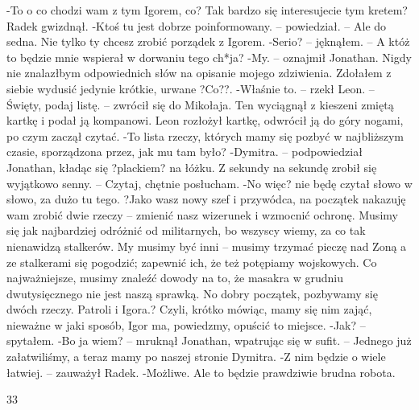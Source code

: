 \documentclass[../MAIN.tex]{subfiles}
\begin{document}
-To o co chodzi wam z tym Igorem, co? Tak bardzo się interesujecie tym kretem?
Radek gwizdnął.
-Ktoś tu jest dobrze poinformowany. -- powiedział. -- Ale do sedna. Nie tylko ty chcesz zrobić porządek z Igorem.
-Serio? -- jęknąłem. -- A któż to będzie mnie wspierał w dorwaniu tego ch*ja?
-My. -- oznajmił Jonathan.
Nigdy nie znalazłbym odpowiednich słów na opisanie mojego zdziwienia. Zdołałem z siebie wydusić jedynie krótkie, urwane ?Co??.
-Właśnie to. -- rzekł Leon. -- Święty, podaj listę. -- zwrócił się do Mikołaja. Ten wyciągnął z kieszeni zmiętą kartkę i podał ją kompanowi.
Leon rozłożył kartkę, odwrócił ją do góry nogami, po czym zaczął czytać.
-To lista rzeczy, których mamy się pozbyć w najbliższym czasie, sporządzona przez, jak mu tam było?
-Dymitra. -- podpowiedział Jonathan, kładąc się ?plackiem? na łóżku. Z sekundy na sekundę zrobił się wyjątkowo senny. -- Czytaj, chętnie posłucham.
-No więc? nie będę czytał słowo w słowo, za dużo tu tego. ?Jako wasz nowy szef i przywódca, na początek nakazuję wam zrobić dwie rzeczy -- zmienić nasz wizerunek i wzmocnić ochronę. Musimy się jak najbardziej odróżnić od militarnych, bo wszyscy wiemy, za co tak nienawidzą stalkerów. My musimy być inni -- musimy trzymać pieczę nad Zoną a ze stalkerami się pogodzić; zapewnić ich, że też potępiamy wojskowych. Co najważniejsze, musimy znaleźć dowody na to, że masakra w grudniu dwutysięcznego nie jest naszą sprawką. No dobry początek, pozbywamy się dwóch rzeczy. Patroli i Igora.?
Czyli, krótko mówiąc, mamy się nim zająć, nieważne w jaki sposób, Igor ma, powiedzmy, opuścić to miejsce.
-Jak? -- spytałem.
-Bo ja wiem? -- mruknął Jonathan, wpatrując się w sufit. -- Jednego już załatwiliśmy, a teraz mamy po naszej stronie Dymitra.
-Z nim będzie o wiele łatwiej. -- zauważył Radek.
-Możliwe. Ale to będzie prawdziwie brudna robota.

33
\end{document}
